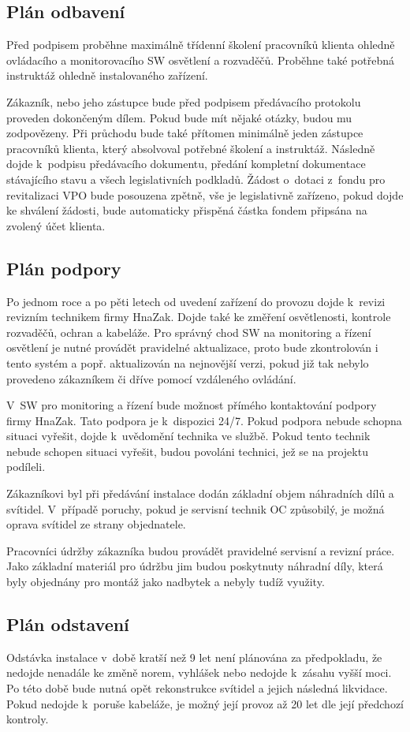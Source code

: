 \documentclass[a4paper, twoside, 11pt]{article}
\begin{document}
	\subsection{Plán odbavení}
	 Před podpisem proběhne maximálně třídenní školení pracovníků klienta ohledně ovládacího a monitorovacího SW osvětlení a rozvaděčů. Proběhne také potřebná instruktáž ohledně instalovaného zařízení.\par
		Zákazník, nebo jeho zástupce bude před podpisem předávacího protokolu proveden dokončeným dílem. Pokud bude mít nějaké otázky, budou mu zodpovězeny. Při průchodu bude také přítomen minimálně jeden zástupce pracovníků klienta, který absolvoval potřebné školení a instruktáž. Následně dojde k~podpisu předávacího dokumentu, předání kompletní dokumentace stávajícího stavu a všech legislativních podkladů. Žádost o~dotaci z~fondu pro revitalizaci VPO bude posouzena zpětně, vše je legislativně zařízeno, pokud dojde ke shválení žádosti, bude automaticky přispěná částka fondem připsána na zvolený účet klienta.
	\subsection{Plán podpory}
	Po jednom roce a po pěti letech od uvedení zařízení do provozu dojde k~revizi revizním technikem firmy HnaZak. Dojde také ke změření osvětlenosti, kontrole rozvaděčů, ochran a kabeláže. Pro správný chod SW na monitoring a řízení osvětlení je nutné provádět pravidelné aktualizace, proto bude zkontrolován i tento systém a popř. aktualizován na nejnovější verzi, pokud již tak nebylo provedeno zákazníkem či dříve pomocí vzdáleného ovládání.\par
	V~SW pro monitoring a řízení bude možnost přímého kontaktování podpory firmy HnaZak. Tato podpora je k~dispozici 24/7. Pokud podpora nebude schopna situaci vyřešit, dojde k~uvědomění technika ve službě. Pokud tento technik nebude schopen situaci vyřešit, budou povoláni technici, jež se na projektu podíleli.\par
	Zákazníkovi byl při předávání instalace dodán základní objem náhradních dílů a svítidel. V~případě poruchy, pokud je servisní technik OC způsobilý, je možná oprava svítidel ze strany objednatele.\par
	Pracovníci údržby zákazníka budou provádět pravidelné servisní a revizní práce. Jako základní materiál pro údržbu jim budou poskytnuty náhradní díly, která byly objednány pro montáž jako nadbytek a nebyly tudíž využity.
	\subsection{Plán odstavení}
		Odstávka instalace v~době kratší než 9 let není plánována za předpokladu, že nedojde nenadále ke změně norem, vyhlášek nebo nedojde k~zásahu vyšší moci. Po této době bude nutná opět rekonstrukce svítidel a jejich následná likvidace. Pokud nedojde k~poruše kabeláže, je možný její provoz až 20 let dle její předchozí kontroly.
\end{document}
